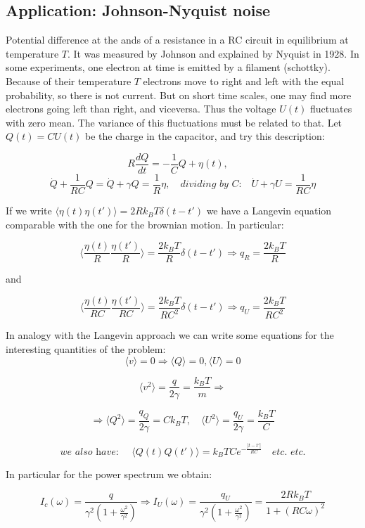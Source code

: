 \documentclass{article}
\begin{document}
\subsection{Application: Johnson-Nyquist noise}
Potential difference at the ands of a resistance in a RC circuit in equilibrium at temperature $T$. It was measured by Johnson and explained by Nyquist in 1928. In some experiments, one electron at time is emitted by a filament (schottky). Because of their temperature $T$ electrons move to right and left with the equal probability, so there is not current. But on short time scales, one may find more electrons going left than right, and viceversa. Thus the voltage $U(t)$ fluctuates with zero mean. The variance of this fluctuations must be related to that. Let $Q(t) = C U(t)$ be the charge in the capacitor, and try this description: 

$$ R \frac{dQ}{dt} = - \frac{1}{C}Q + \eta(t), \quad$$
$$ \dot{Q} + \frac{1}{RC} Q = \dot{Q} + \gamma Q = \frac{1}{R} \eta, \quad  \textit{dividing by C:} \quad \dot{U} + \gamma U  = \frac{1}{RC} \eta$$

If we write $\langle \eta(t) \eta(t') \rangle = 2 R k_B T \delta(t-t')$ we have a Langevin equation comparable with the one for the brownian motion. In particular:

$$\langle \frac{\eta(t)}{R}  \frac{\eta(t')}{R} \rangle = \frac{2 k_B T}{R} \delta(t-t') \Rightarrow q_R = \frac{2k_B T}{R} $$

and

$$\langle \frac{\eta(t)}{RC}  \frac{\eta(t')}{RC} \rangle = \frac{2 k_B T}{RC^2} \delta(t-t') \Rightarrow q_U = \frac{2k_B T}{RC^2} $$

In analogy with the Langevin approach we can write some equations for the interesting quantities of the problem:
$$\langle v \rangle = 0 \Rightarrow \langle Q \rangle =0 , \langle U \rangle =0 $$

$$ \langle v^2 \rangle = \frac{q}{2 \gamma} = \frac{k_B T}{m} \Rightarrow $$

$$\Rightarrow \langle Q^2 \rangle = \frac{q_Q}{2 \gamma} = C k_B T, \quad  \langle U^2 \rangle = \frac{q_U}{2 \gamma} = \frac{k_B T}{C}$$

$$\textit{we also have: } \quad \langle Q(t)Q(t') \rangle = k_B T C e^{-\frac{|t-t'|}{RC}} \quad \textit{etc. etc.}$$

In particular for the power spectrum we obtain:

$$ I_c(\omega) = \frac{ q }{ \gamma^2(1 + \frac{\omega^2}{\gamma^2}) } \Rightarrow I_U(\omega) = \frac{ q_U }{\gamma^2(1 + \frac{\omega^2}{\gamma^2} )} = \frac{ 2 R k_B T}{1 + (RC\omega)^2} $$
\end{document}
